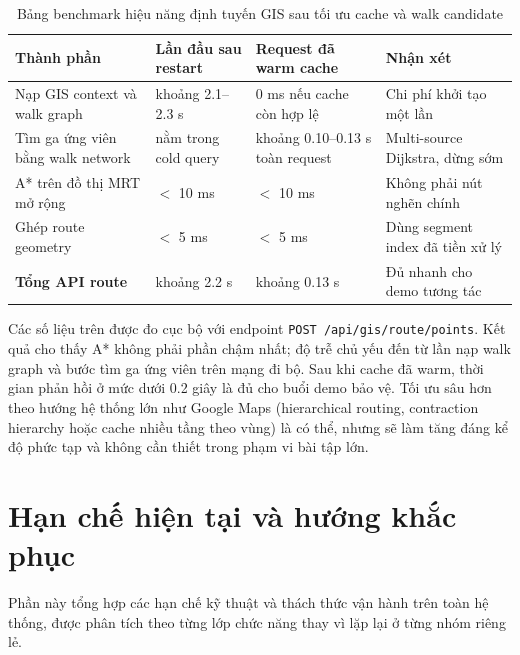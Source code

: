 ﻿\documentclass[../DoAn.tex]{subfiles}
\begin{document}
\begin{table}[H]
\centering
\caption{Bảng benchmark hiệu năng định tuyến GIS sau tối ưu cache và walk candidate}
\label{tab:performance_benchmark}
\begin{tabular}{|p{4.3cm}|p{3.4cm}|p{3.4cm}|p{3.0cm}|}
\hline
\textbf{Thành phần} & \textbf{Lần đầu sau restart} & \textbf{Request đã warm cache} & \textbf{Nhận xét} \\ \hline
Nạp GIS context và walk graph & khoảng 2.1--2.3 s & 0 ms nếu cache còn hợp lệ & Chi phí khởi tạo một lần \\ \hline
Tìm ga ứng viên bằng walk network & nằm trong cold query & khoảng 0.10--0.13 s toàn request & Multi-source Dijkstra, dừng sớm \\ \hline
A* trên đồ thị MRT mở rộng & $<$ 10 ms & $<$ 10 ms & Không phải nút nghẽn chính \\ \hline
Ghép route geometry & $<$ 5 ms & $<$ 5 ms & Dùng segment index đã tiền xử lý \\ \hline
\textbf{Tổng API route} & khoảng 2.2 s & khoảng 0.13 s & Đủ nhanh cho demo tương tác \\ \hline
\end{tabular}
\end{table}

Các số liệu trên được đo cục bộ với endpoint \texttt{POST /api/gis/route/points}. Kết quả cho thấy A* không phải phần chậm nhất; độ trễ chủ yếu đến từ lần nạp walk graph và bước tìm ga ứng viên trên mạng đi bộ. Sau khi cache đã warm, thời gian phản hồi ở mức dưới 0.2 giây là đủ cho buổi demo bảo vệ. Tối ưu sâu hơn theo hướng hệ thống lớn như Google Maps (hierarchical routing, contraction hierarchy hoặc cache nhiều tầng theo vùng) là có thể, nhưng sẽ làm tăng đáng kể độ phức tạp và không cần thiết trong phạm vi bài tập lớn.

\section{Hạn chế hiện tại và hướng khắc phục}
Phần này tổng hợp các hạn chế kỹ thuật và thách thức vận hành trên toàn hệ thống, được phân tích theo từng lớp chức năng thay vì lặp lại ở từng nhóm riêng lẻ.
\end{document}
